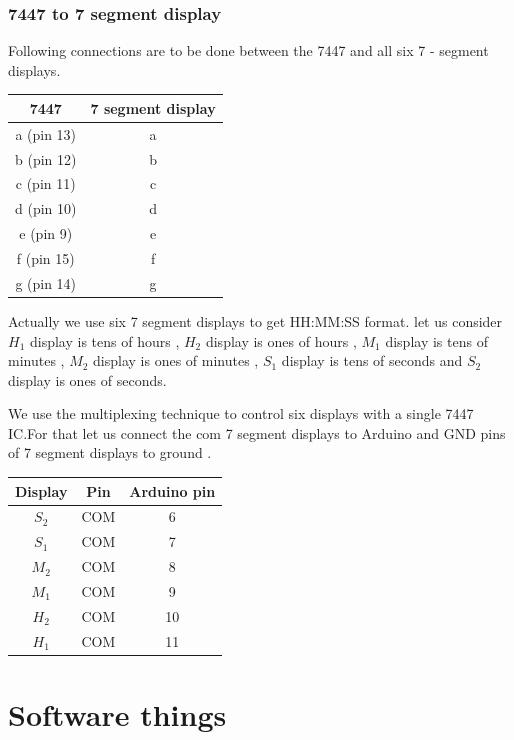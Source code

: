\documentclass{article}
\begin{document}
\subsubsection{7447 to 7 segment display}
Following connections are to be done between the 7447 and all six 7 - segment displays.

\begin{center}
    \begin{tabular}{|c|c|}
    \hline
    \textbf{7447}& \textbf{7 segment display}  \\
    \hline
    a (pin 13)& a \\
    \hline
    b (pin 12)& b \\
    \hline
    c (pin 11)& c \\
    \hline
    d (pin 10) & d \\
    \hline
    e (pin 9) & e \\
    \hline 
    f (pin 15) & f \\
    \hline 
    g (pin 14) & g \\
    \hline
    \end{tabular}
\end{center}
Actually we use six 7 segment displays to get HH:MM:SS format. let us consider $H_1$ display is tens of hours , $H_2$ display is ones of hours , $M_1$ display is tens of minutes , $M_2$ display is ones of minutes , $S_1$ display is tens of seconds and $S_2$ display is ones of seconds.

We use the multiplexing technique to control six displays with a single 7447 IC.For that let us connect the com 7 segment displays to Arduino and GND pins of 7 segment displays to ground .

\begin{center}
\begin{tabular}{|c|c|c|}
    \hline
    \textbf{Display} & \textbf{Pin} & \textbf{Arduino pin} \\
    \hline
    $S_2$ & COM & 6 \\
    \hline
    $S_1$ & COM & 7 \\
    \hline
    $M_2$ & COM & 8\\
    \hline
    $M_1$ & COM & 9 \\
    \hline
    $H_2$ & COM & 10\\
    \hline
    $H_1$ & COM & 11 \\
    \hline
\end{tabular}
\end{center}


\section{Software things}
\end{document}
